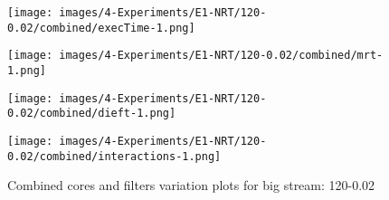 \begin{figure}[H]
    \centering
    \hspace*{-3cm} %
    \begin{minipage}{0.5\textwidth}
        \centering
        \texttt{[image: images/4-Experiments/E1-NRT/120-0.02/combined/execTime-1.png]}
        \caption*{}
    \end{minipage}
    \hspace{0.16\textwidth}
    \begin{minipage}{0.5\textwidth}
        \centering
        \texttt{[image: images/4-Experiments/E1-NRT/120-0.02/combined/mrt-1.png]}
        \caption*{}
    \end{minipage}
    
    \vspace{0.5cm} %

    \hspace*{-3cm} %
    \begin{minipage}{0.5\textwidth}
        \centering
        \texttt{[image: images/4-Experiments/E1-NRT/120-0.02/combined/dieft-1.png]}
        \caption*{}
    \end{minipage}
    \hspace{0.16\textwidth}
    \begin{minipage}{0.5\textwidth}
        \centering
        \texttt{[image: images/4-Experiments/E1-NRT/120-0.02/combined/interactions-1.png]}
        \caption*{}
    \end{minipage}

    \caption{Combined cores and filters variation plots for big stream: 120-0.02}
    \label{img:exps-small-120-combined}
\end{figure}

